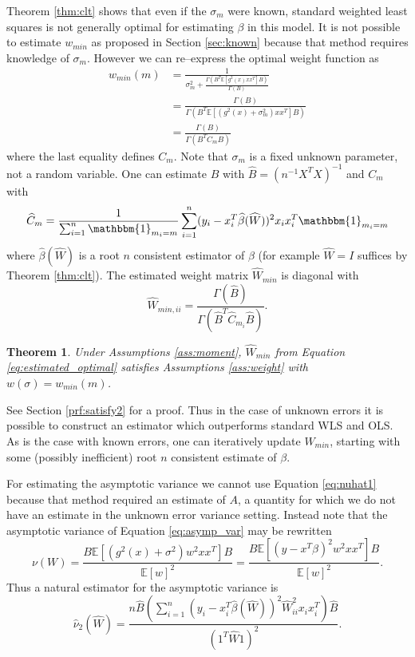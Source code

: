 \documentclass[ejs,ps,preprint]{imsart}
\numberwithin{equation}{section}
\theoremstyle{plain}
\newtheorem{thm}{Theorem}[section]
\newcommand{\E}{\mathbb{E}}
\newcommand{\ind}[1]{\mathbbm{1}_{#1}}
\def\E{\mathbb{E}}
\begin{document}
Theorem \ref{thm:clt} shows that even if the $\sigma_{m}$ were known, standard weighted least squares is not generally optimal for estimating $\beta$ in this model. It is not possible to estimate $w_{min}$ as proposed in Section \ref{sec:known} because that method requires knowledge of $\sigma_m$. However we can re--express the optimal weight function as
\begin{align*}
w_{min}(m) &= \frac{1}{\sigma_m^2 + \frac{\Gamma(B^T\E[g^2(x)xx^T]B)}{\Gamma(B)}}\\
&= \frac{\Gamma(B)}{\Gamma(B^T\E[(g^2(x)+\sigma_m^2)xx^T]B)}\\
&= \frac{\Gamma(B)}{\Gamma(B^TC_mB)}
\end{align*}
where the last equality defines $C_m$. Note that $\sigma_m$ is a fixed unknown parameter, not a random variable. One can estimate $B$ with $\widehat{B} = (n^{-1}X^TX)^{-1}$ and $C_m$ with
\begin{equation*}
\widehat{C}_m = \frac{1}{\sum_{i=1}^n \ind{m_i=m}} \sum_{i=1}^n (y_i - x_i^T\widehat{\beta}(\widehat{W}))^2x_ix_i^T\ind{m_i=m}
\end{equation*}
where $\widehat{\beta}(\widehat{W})$ is a root $n$ consistent estimator of $\beta$ (for example $\widehat{W} = I$ suffices by Theorem \ref{thm:clt}). The estimated weight matrix $\widehat{W}_{min}$ is diagonal with 
\begin{equation}
\label{eq:estimated_optimal}
\widehat{W}_{min,ii} =  \frac{\Gamma(\widehat{B})}{\Gamma(\widehat{B}^T\widehat{C}_{m_i}\widehat{B})}.
\end{equation}
\begin{thm}
\label{thm:satisfy2}
Under Assumptions \ref{ass:moment}, $\widehat{W}_{min}$ from Equation \eqref{eq:estimated_optimal} satisfies Assumptions \ref{ass:weight} with $w(\sigma) = w_{min}(m)$.
\end{thm}
See Section \ref{prf:satisfy2} for a proof. Thus in the case of unknown errors it is possible to construct an estimator which outperforms standard WLS and OLS. As is the case with known errors, one can iteratively update $\widehat{W}_{min}$, starting with some (possibly inefficient) root $n$ consistent estimate of $\beta$.

For estimating the asymptotic variance we cannot use Equation \eqref{eq:nuhat1} because that method required an estimate of $A$, a quantity for which we do not have an estimate in the unknown error variance setting. Instead note that the asymptotic variance of Equation \eqref{eq:asymp_var} may be rewritten
\begin{equation*}
  \nu(W) = \frac{B \E[(g^2(x) + \sigma^2)w^2xx^T] B}{\E[w]^2} = \frac{B \E[(y - x^T\beta)^2w^2xx^T] B}{\E[w]^2}.
\end{equation*}
Thus a natural estimator for the asymptotic variance is
\begin{equation}
  \label{eq:nuhat2}
\widehat{\nu}_2(\widehat{W}) = \frac{n\widehat{B} \left(\sum_{i=1}^n (y_i - x_i^T\widehat{\beta}(\widehat{W}))^2\widehat{W}_{ii}^2x_ix_i^T\right) \widehat{B}}{(1^T\widehat{W}1)^2}.
\end{equation}
\end{document}
